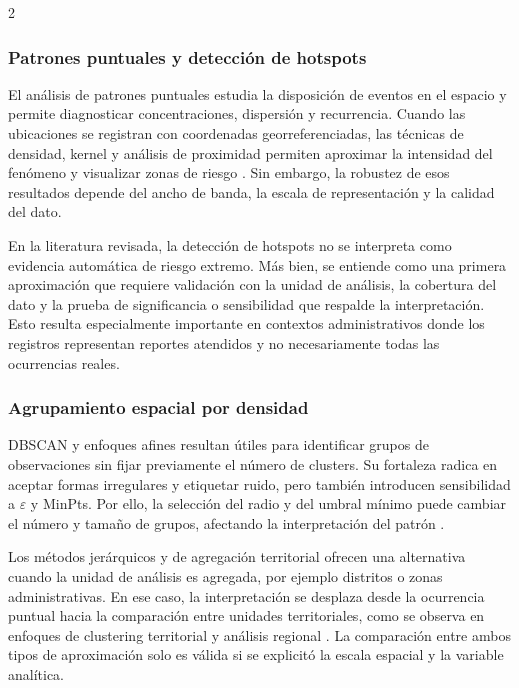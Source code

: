 \documentclass[10pt,twoside]{article}
\begin{document}
\begin{multicols}{2}
\subsubsection{Patrones puntuales y detección de hotspots}

El análisis de patrones puntuales estudia la disposición de eventos en el espacio y permite diagnosticar concentraciones, dispersión y recurrencia. Cuando las ubicaciones se registran con coordenadas georreferenciadas, las técnicas de densidad, kernel y análisis de proximidad permiten aproximar la intensidad del fenómeno y visualizar zonas de riesgo \cite{medinaariza2023points,medinaariza2023hotspots}. Sin embargo, la robustez de esos resultados depende del ancho de banda, la escala de representación y la calidad del dato.

En la literatura revisada, la detección de hotspots no se interpreta como evidencia automática de riesgo extremo. Más bien, se entiende como una primera aproximación que requiere validación con la unidad de análisis, la cobertura del dato y la prueba de significancia o sensibilidad que respalde la interpretación. Esto resulta especialmente importante en contextos administrativos donde los registros representan reportes atendidos y no necesariamente todas las ocurrencias reales.

\subsubsection{Agrupamiento espacial por densidad}

DBSCAN y enfoques afines resultan útiles para identificar grupos de observaciones sin fijar previamente el número de clusters. Su fortaleza radica en aceptar formas irregulares y etiquetar ruido, pero también introducen sensibilidad a $\varepsilon$ y MinPts. Por ello, la selección del radio y del umbral mínimo puede cambiar el número y tamaño de grupos, afectando la interpretación del patrón \cite{changalasetty2023dbscan,leon2026dbscan}.

Los métodos jerárquicos y de agregación territorial ofrecen una alternativa cuando la unidad de análisis es agregada, por ejemplo distritos o zonas administrativas. En ese caso, la interpretación se desplaza desde la ocurrencia puntual hacia la comparación entre unidades territoriales, como se observa en enfoques de clustering territorial y análisis regional \cite{gustriansyah2022crime}. La comparación entre ambos tipos de aproximación solo es válida si se explicitó la escala espacial y la variable analítica.


\end{multicols}
\end{document}
